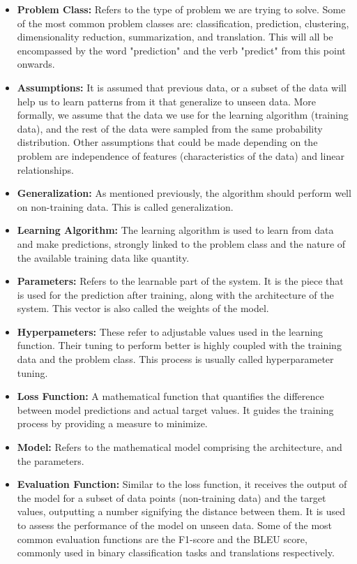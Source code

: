 \begin{itemize}
    \item \textbf{Problem Class:}
    Refers to the type of problem we are trying to solve. Some of the most common problem classes are: classification, prediction, clustering, dimensionality reduction, summarization, and translation. This will all be encompassed by the word "prediction" and the verb "predict" from this point onwards.
    \item \textbf{Assumptions:}
    It is assumed that previous data, or a subset of the data will help us to learn patterns from it that generalize to unseen data. More formally, we assume that the data we use for the learning algorithm (training data), and the rest of the data were sampled from the same probability distribution. Other assumptions that could be made depending on the problem are independence of features (characteristics of the data) and linear relationships.
    \item \textbf{Generalization:}
    As mentioned previously, the algorithm should perform well on non-training data. This is called generalization.
    \item \textbf{Learning Algorithm:}
    The learning algorithm is used to learn from data and make predictions, strongly linked to the problem class and the nature of the available training data like quantity.
    \item \textbf{Parameters:}
    Refers to the learnable part of the system. It is the piece that is used for the prediction after training, along with the architecture of the system. This vector is also called the weights of the model.
    \item \textbf{Hyperpameters:}
    These refer to adjustable values used in the learning function. Their tuning to perform better is highly coupled with the training data and the problem class. This process is usually called hyperparameter tuning.
    \item \textbf{Loss Function:}
    A mathematical function that quantifies the difference between model predictions and actual target values. It guides the training process by providing a measure to minimize.
    
    \item \textbf{Model:}
    Refers to the mathematical model comprising the architecture, and the parameters.
    
    \item \textbf{Evaluation Function:}
    Similar to the loss function, it receives the output of the model for a subset of data points (non-training data) and the target values, outputting a number signifying the distance between them. It is used to assess the performance of the model on unseen data. Some of the most common evaluation functions are the F1-score and the BLEU score, commonly used in binary classification tasks \cite{lipton2014thresholding} and translations \cite{ghassemiazghandi2024evaluation} respectively.


\end{itemize}
